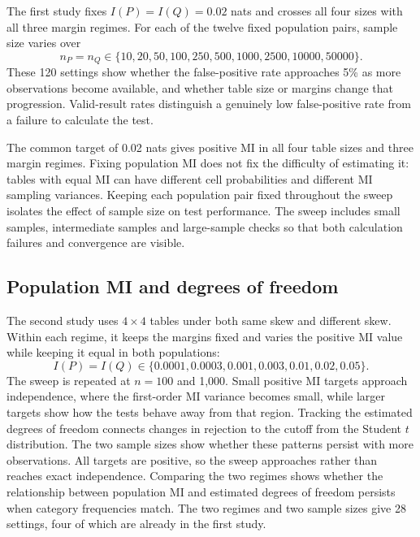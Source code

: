 The first study fixes \(I(P)=I(Q)=0.02\) nats and crosses all four sizes
with all three margin regimes. For each of the twelve fixed population
pairs, sample size varies over
\begin{equation}
 n_P=n_Q\in\{10,20,50,100,250,500,1000,2500,10000,50000\}.
 \label{eq:null-sample-grid}
\end{equation}
These 120 settings show whether the false-positive rate approaches 5\%
as more observations become available, and whether table size or margins
change that progression. Valid-result rates distinguish a genuinely low
false-positive rate from a failure to calculate the test.

The common target of 0.02 nats gives positive MI in all four table sizes
and three margin regimes. Fixing population MI does not fix the
difficulty of estimating it: tables with equal MI can have different
cell probabilities and different MI sampling variances. Keeping each
population pair fixed throughout the sweep isolates the effect of sample
size on test performance.
The sweep includes small samples, intermediate samples and large-sample
checks so that both calculation failures and convergence are visible.

\subsection{Population MI and degrees of freedom}

The second study uses \(4\times4\) tables under both same skew and
different skew. Within each regime, it keeps the margins fixed and varies
the positive MI value while keeping it equal in both populations:
\begin{equation}
 I(P)=I(Q)\in\{0.0001,0.0003,0.001,0.003,0.01,0.02,0.05\}.
 \label{eq:association-grid}
\end{equation}
The sweep is repeated at \(n=100\) and 1,000. Small positive MI targets
approach independence, where the first-order MI variance becomes small,
while larger targets show how the tests behave away from that region. Tracking
the estimated degrees of freedom connects changes in rejection to the
cutoff from the Student \(t\) distribution. The two sample sizes show
whether these patterns persist with more observations. All targets are
positive, so the sweep approaches rather than reaches exact independence.
Comparing the two regimes shows whether the relationship between population
MI and estimated degrees of freedom persists when category frequencies
match. The two regimes and two sample sizes give 28 settings, four of which
are already in the first study.

